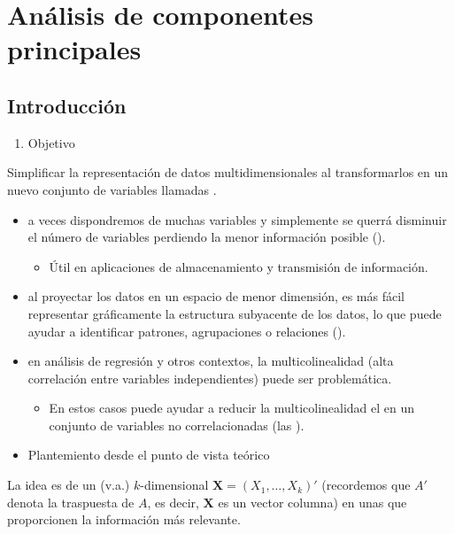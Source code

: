 \section{Análisis de componentes principales}
\subsection{Introducción}
\begin{enumerate}[label=\arabic*)]
	\item Objetivo
\end{enumerate}
Simplificar la representación de datos multidimensionales al transformarlos en un nuevo conjunto de variables llamadas .
\begin{itemize}
	\item {} a veces dispondremos de muchas variables y simplemente se querrá disminuir el número de variables perdiendo la menor información posible ().
	\begin{itemize}
		\item Útil en aplicaciones de almacenamiento y transmisión de información.
	\end{itemize}
	\item {} al proyectar los datos en un espacio de menor dimensión, es más fácil representar gráficamente la estructura subyacente de los datos, lo que puede ayudar a identificar patrones, agrupaciones o relaciones ().
	\item {} en análisis de regresión y otros contextos, la multicolinealidad (alta correlación entre variables independientes) puede ser problemática.
	\begin{itemize}
		\item En estos casos puede ayudar a reducir la multicolinealidad el  en un conjunto de variables no correlacionadas (las ).
	\end{itemize}
\end{itemize}
\begin{itemize}[label=\color{red}\textbullet, leftmargin=*]
	\item \color{lightblue}Plantemiento desde el punto de vista teórico
\end{itemize}
La idea es  de un \vea (v.a.) $k$-dimensional $\mathbf{X}=(X_1,\dots,X_k)'$ (recordemos que $A'$ denota la traspuesta de $A$, es decir, $\mathbf{X}$ es un vector columna) en unas  que proporcionen la información más relevante.

